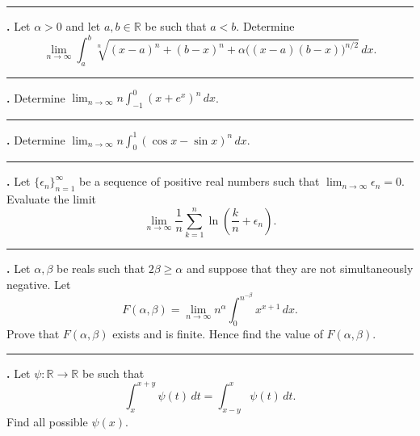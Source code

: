 \documentclass[11pt]{article}
\newcounter{probnum}
\newenvironment{problembox}{\par\noindent\rule{\linewidth}{0.5pt}\vspace{5pt}\par}{\vspace{2pt}}
\begin{document}
\begin{problembox}
\textbf{\theprobnum.} Let $\alpha > 0$ and let $a, b \in \mathbb{R}$ be such that $a < b$. Determine
\[
\lim_{n \to \infty} \int_a^b \sqrt[n]{(x-a)^n + (b-x)^n + \alpha\big((x-a)(b-x)\big)^{n/2}}\,dx.
\]
\end{problembox}

\begin{problembox}
\textbf{\theprobnum.} Determine $\displaystyle\lim_{n \to \infty} n \int_{-1}^{0} (x+e^x)^n\,dx$.
\end{problembox}

\begin{problembox}
\textbf{\theprobnum.} Determine $\displaystyle\lim_{n \to \infty} n \int_0^1 (\cos x - \sin x)^n\,dx$.
\end{problembox}

\begin{problembox}
\textbf{\theprobnum.} Let $\{\epsilon_n\}_{n=1}^{\infty}$ be a sequence of positive real numbers such that $\lim_{n \to \infty} \epsilon_n = 0$. Evaluate the limit
\[
\lim_{n \to \infty} \frac{1}{n} \sum_{k=1}^{n} \ln\left(\frac{k}{n} + \epsilon_n\right).
\]
\end{problembox}

\begin{problembox}
\textbf{\theprobnum.} Let $\alpha, \beta$ be reals such that $2\beta \ge \alpha$ and suppose that they are not simultaneously negative. Let
\[
F(\alpha,\beta) = \lim_{n \to \infty} n^{\alpha} \int_0^{n^{-\beta}} x^{x+1}\,dx.
\]
Prove that $F(\alpha,\beta)$ exists and is finite. Hence find the value of $F(\alpha,\beta)$.
\end{problembox}

\begin{problembox}
\textbf{\theprobnum.} Let $\psi : \mathbb{R} \to \mathbb{R}$ be such that
\[
\int_x^{x+y} \psi(t)\,dt = \int_{x-y}^{x} \psi(t)\,dt.
\]
Find all possible $\psi(x)$.
\end{problembox}
\end{document}
